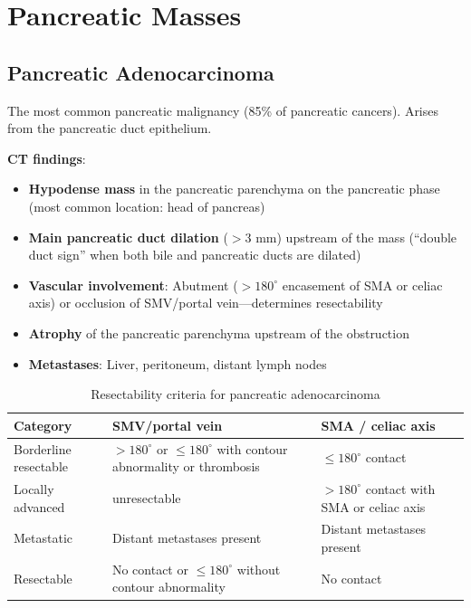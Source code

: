 \section{Pancreatic Masses}

\subsection{Pancreatic Adenocarcinoma}
The most common pancreatic malignancy (85\% of pancreatic cancers). Arises from the pancreatic duct epithelium.

\textbf{CT findings}:
\begin{itemize}
  \item \textbf{Hypodense mass} in the pancreatic parenchyma on the pancreatic phase (most common location: head of pancreas)
  \item \textbf{Main pancreatic duct dilation} ($> 3$ mm) upstream of the mass (``double duct sign'' when both bile and pancreatic ducts are dilated)
  \item \textbf{Vascular involvement}: Abutment ($> 180^\circ$ encasement of SMA or celiac axis) or occlusion of SMV/portal vein---determines resectability
  \item \textbf{Atrophy} of the pancreatic parenchyma upstream of the obstruction
  \item \textbf{Metastases}: Liver, peritoneum, distant lymph nodes
\end{itemize}

\begin{table}[h]
\centering
\caption{Resectability criteria for pancreatic adenocarcinoma}
\begin{tabular}{p{3cm} p{4.5cm} p{4.5cm}}
\hline
\textbf{Category} & \textbf{SMV/portal vein} & \textbf{SMA / celiac axis} \\
\hline
Borderline resectable & $> 180^\circ$ or $\leq 180^\circ$ with contour abnormality or thrombosis & $\leq 180^\circ$ contact \\
Locally advanced & unresectable & $> 180^\circ$ contact with SMA or celiac axis \\
Metastatic & Distant metastases present & Distant metastases present \\
Resectable & No contact or $\leq 180^\circ$ without contour abnormality & No contact \\
\hline
\end{tabular}
\end{table}

